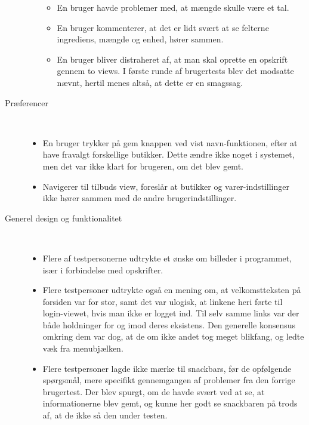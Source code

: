 \begin{description}
\begin{itemize}
\begin{itemize}[nolistsep, noitemsep]
         \item En bruger havde problemer med, at mængde skulle være et tal.
         \item En bruger kommenterer, at det er lidt svært at se felterne ingrediens, mængde og enhed, hører sammen.
         \item En bruger bliver distraheret af, at man skal oprette en opskrift gennem to views.
         I første runde af brugertests blev det modsatte nævnt, hertil menes altså, at dette er en smagssag.
      \end{itemize} 
   \end{itemize}
   \item[Præferencer]\hfill\\
   \vspace{-15pt}
   \begin{itemize}[nolistsep, noitemsep]
      \item En bruger trykker på gem knappen ved vist navn-funktionen, efter at have fravalgt forskellige butikker.
      Dette ændre ikke noget i systemet, men det var ikke klart for brugeren, om det blev gemt.
      \item Navigerer til tilbuds view, foreslår at butikker og varer-indstillinger ikke hører sammen med de andre brugerindstillinger.
   \end{itemize}
   \item[Generel design og funktionalitet]\hfill\\
   \vspace{-15pt}
   \begin{itemize}[nolistsep, noitemsep]
      \item Flere af testpersonerne udtrykte et ønske om billeder i programmet, især i forbindelse med opskrifter.
      \item Flere testpersoner udtrykte også en mening om, at velkomstteksten på forsiden var for stor, samt det var ulogisk, at linkene heri førte til login-viewet, hvis man ikke er logget ind.
      Til selv samme links var der både holdninger for og imod deres eksistens.
      Den generelle konsensus omkring dem var dog, at de om ikke andet tog meget blikfang, og ledte væk fra menubjælken.
      \item Flere testpersoner lagde ikke mærke til snackbars, før de opfølgende spørgsmål, mere specifikt gennemgangen af problemer fra den forrige brugertest.
      Der blev spurgt, om de havde svært ved at se, at informationerne blev gemt, og kunne her godt se snackbaren på trods af, at de ikke så den under testen.
   \end{itemize}
\end{description}

